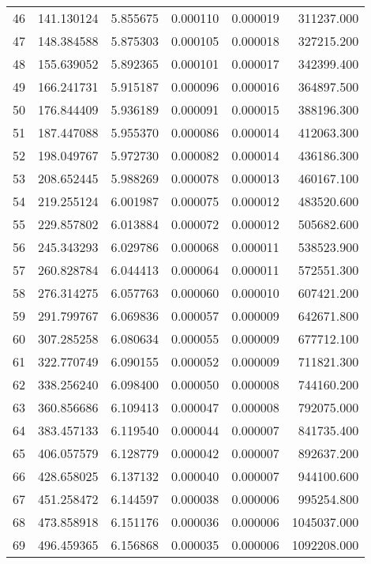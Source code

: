 \begin{tabular}{lrrrrr}
46 &   141.130124 &  5.855675 &  0.000110 &  0.000019 &   311237.000 \\
47 &   148.384588 &  5.875303 &  0.000105 &  0.000018 &   327215.200 \\
48 &   155.639052 &  5.892365 &  0.000101 &  0.000017 &   342399.400 \\
49 &   166.241731 &  5.915187 &  0.000096 &  0.000016 &   364897.500 \\
50 &   176.844409 &  5.936189 &  0.000091 &  0.000015 &   388196.300 \\
51 &   187.447088 &  5.955370 &  0.000086 &  0.000014 &   412063.300 \\
52 &   198.049767 &  5.972730 &  0.000082 &  0.000014 &   436186.300 \\
53 &   208.652445 &  5.988269 &  0.000078 &  0.000013 &   460167.100 \\
54 &   219.255124 &  6.001987 &  0.000075 &  0.000012 &   483520.600 \\
55 &   229.857802 &  6.013884 &  0.000072 &  0.000012 &   505682.600 \\
56 &   245.343293 &  6.029786 &  0.000068 &  0.000011 &   538523.900 \\
57 &   260.828784 &  6.044413 &  0.000064 &  0.000011 &   572551.300 \\
58 &   276.314275 &  6.057763 &  0.000060 &  0.000010 &   607421.200 \\
59 &   291.799767 &  6.069836 &  0.000057 &  0.000009 &   642671.800 \\
60 &   307.285258 &  6.080634 &  0.000055 &  0.000009 &   677712.100 \\
61 &   322.770749 &  6.090155 &  0.000052 &  0.000009 &   711821.300 \\
62 &   338.256240 &  6.098400 &  0.000050 &  0.000008 &   744160.200 \\
63 &   360.856686 &  6.109413 &  0.000047 &  0.000008 &   792075.000 \\
64 &   383.457133 &  6.119540 &  0.000044 &  0.000007 &   841735.400 \\
65 &   406.057579 &  6.128779 &  0.000042 &  0.000007 &   892637.200 \\
66 &   428.658025 &  6.137132 &  0.000040 &  0.000007 &   944100.600 \\
67 &   451.258472 &  6.144597 &  0.000038 &  0.000006 &   995254.800 \\
68 &   473.858918 &  6.151176 &  0.000036 &  0.000006 &  1045037.000 \\
69 &   496.459365 &  6.156868 &  0.000035 &  0.000006 &  1092208.000 \\

\end{tabular}
